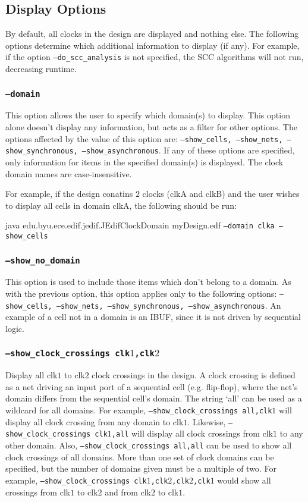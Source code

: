 \subsection{Display Options}
By default, all clocks in the design are displayed and nothing else. The
following options determine which additional information to display (if any).
For example, if the option  \texttt{--do\_scc\_analysis} is not specified, the
SCC algorithms will not run, decreasing runtime.

\subsubsection{\texttt{--domain}}
This option allows the user to specify which domain(s) to display.  This option
alone doesn't display any information, but acts as a filter for other options. 
The options affected by the value of this option are:
\texttt{--show\_cells, --show\_nets, --show\_synchronous, --show\_asynchronous}.
If any of these options are specified, only information for items in the
specified domain(s) is displayed. The clock domain names are case-insensitive.

For example, if the design conatins $2$ clocks (clkA and clkB) and the user
wishes to display all cells in domain clkA, the following should be run:

java edu.byu.ece.edif.jedif.JEdifClockDomain myDesign.edf \texttt{--domain clka
--show\_cells}

\subsubsection{\texttt{--show\_no\_domain}}
This option is used to include those items which don't belong to a domain. As
with the previous option, this option applies only to the following options:
\texttt{--show\_cells, --show\_nets, --show\_synchronous, --show\_asynchronous}.
An example of a cell not in a domain is an IBUF, since it is not driven by
sequential logic.

\subsubsection{\texttt{--show\_clock\_crossings clk$1$,clk$2$}}
Display all clk$1$ to clk$2$ clock crossings in the design.  A clock crossing is
defined as a net driving an input port of a sequential cell (e.g. flip-flop), 
where the net's domain differs from the sequential cell's domain.  The string
`all' can be used as a wildcard for all domains.  For example,
\texttt{--show\_clock\_crossings all,clk$1$} will display all clock crossing
from any domain to clk$1$.  Likewise, \texttt{--show\_clock\_crossings
clk$1$,all} will display all clock crossings from clk$1$ to any other domain. 
Also, \texttt{--show\_clock\_crossings all,all} can be used to show all clock
crossings of all domains.  More than one set of clock domains can be specified,
but the number of domains given must be a multiple of two.  For example,
\texttt{--show\_clock\_crossings clk$1$,clk$2$,clk$2$,clk$1$} would show all
crossings from clk$1$ to clk$2$ and from clk$2$ to clk$1$.

